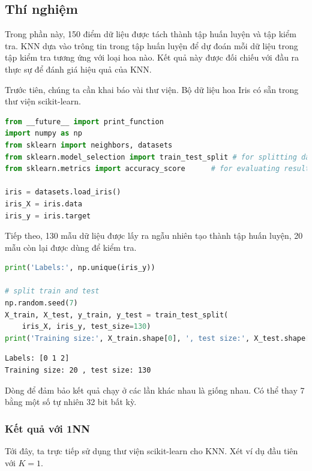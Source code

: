 


\subsection{Thí nghiệm}


Trong phần này, 150 điểm dữ liệu được tách thành tập huấn luyện và tập kiểm tra.
KNN dựa vào trông tin trong tập huấn luyện để dự đoán mỗi dữ liệu trong tập kiểm
tra tương ứng với loại hoa nào. Kết quả này được đối chiếu với đầu ra thực sự
để đánh giá hiệu quả của KNN.

Trước tiên, chúng ta cần khai báo vài thư viện. Bộ dữ liệu hoa Iris có sẵn trong
thư viện scikit-learn.

\begin{lstlisting}[language=Python]
from __future__ import print_function
import numpy as np
from sklearn import neighbors, datasets
from sklearn.model_selection import train_test_split # for splitting data
from sklearn.metrics import accuracy_score      # for evaluating results

iris = datasets.load_iris()
iris_X = iris.data
iris_y = iris.target
\end{lstlisting}

Tiếp theo, 130 mẫu dữ liệu được lấy ra ngẫu nhiên tạo thành tập huấn luyện, 20 mẫu còn lại được dùng để kiểm tra.

\begin{lstlisting}[language=Python]
print('Labels:', np.unique(iris_y))

# split train and test
np.random.seed(7)
X_train, X_test, y_train, y_test = train_test_split(
    iris_X, iris_y, test_size=130)
print('Training size:', X_train.shape[0], ', test size:', X_test.shape[0])
\end{lstlisting}
\begin{lstlisting}
Labels: [0 1 2]
Training size: 20 , test size: 130
\end{lstlisting}

Dòng  để đảm bảo kết quả chạy ở các lần khác nhau là giống nhau. Có thể thay 7 bằng một số tự
nhiên 32 bit bất kỳ.

\subsubsection{Kết quả với 1NN}
Tới đây, ta trực tiếp sử dụng thư viện scikit-learn cho KNN. Xét ví dụ đầu tiên
với $K = 1$.

